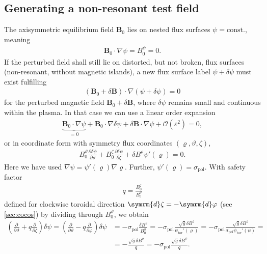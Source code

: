 \documentclass[a4paper, 10pt, english]{article}
\let\temp\varrho
\let\varrho\rho
\let\rho\temp
\let\temp\vartheta
\let\vartheta\theta
\let\theta\temp
\let\temp\varphi
\let\varphi\phi
\let\phi\temp
\let\vec\symbf
\newcommand*\diff{\ensuremath{\symrm{d}}}  %
\newcommand*\pd[2][]{\ensuremath{\frac{\partial #1}{\partial #2}}}  %
\newcommand*\pol{\ensuremath{\textrm{pol}}}  %
\newcommand*\tor{\ensuremath{\textrm{tor}}}  %
\begin{document}
\subsection{Generating a non-resonant test field}

The axisymmetric equilibrium field $\vec{B}_{0}$ lies on nested flux surfaces $\psi = \text{const.}$, meaning
\begin{gather*}
  \vec{B}_{0} \cdot \nabla \psi = B_{0}^{\psi} = 0.
\end{gather*}
If the perturbed field shall still lie on distorted, but not broken, flux surfaces (non-resonant, without magnetic islands), a new flux surface label $\psi + \delta \psi$ must exist fulfilling
\begin{gather*}
  (\vec{B}_{0} + \delta \vec{B}) \cdot \nabla (\psi + \delta \psi) = 0
\end{gather*}
for the perturbed magnetic field $\vec{B}_{0} + \delta \vec{B}$, where $\delta \psi$ remains small and continuous within the plasma. In that case we can use a linear order expansion
\begin{gather*}
  \underbrace{\vec{B}_{0} \cdot \nabla \psi}_{= 0} + \vec{B}_{0} \cdot \nabla \delta \psi + \delta \vec{B} \cdot \nabla \psi + \mathcal{O}(\varepsilon^{2}) = 0,
\end{gather*}
or in coordinate form with symmetry flux coordinates $(\rho, \theta, \zeta)$,
\begin{gather*}
  B_{0}^{\theta} \pd[\delta \psi]{\theta} + B_{0}^{\zeta} \pd[\delta \psi]{\zeta} + \delta B^{\rho} \psi' (\rho) = 0.
\end{gather*}
Here we have used $\nabla \psi = \psi' (\rho) \nabla \rho$. Further, $\psi' (\rho) = \sigma_{\pol}$. With safety factor
\begin{gather*}
  q = \frac{B_{0}^{\zeta}}{B_{0}^{\theta}}
\end{gather*}
defined for clockwise toroidal direction $\diff \zeta = -\diff \phi$ (see \cref{sec:cocos}) by dividing through $B_{0}^{\theta}$, we obtain
\begin{align*}
  \left( \pd{\theta} + q \pd{\zeta} \right) \delta \psi = \left( \pd{\theta} - q \pd{\phi} \right) \delta \psi &= -\sigma_{\pol} \frac{\delta B^{\rho}}{B_{0}^{\theta}} = -\sigma_{\pol} \frac{\sqrt{g} \delta B^{\rho}}{\psi_{\tor}' (\rho)} = -\sigma_{\pol} \frac{\sqrt{g} \delta B^{\rho}}{\sigma_{\pol} \psi_{\tor}' (\psi)} = \\
  &= -\frac{\sqrt{g} \delta B^{\rho}}{q} = -\sigma_{\pol} \frac{\sqrt{g} \delta B^{\psi}}{q}.
\end{align*}
\end{document}
